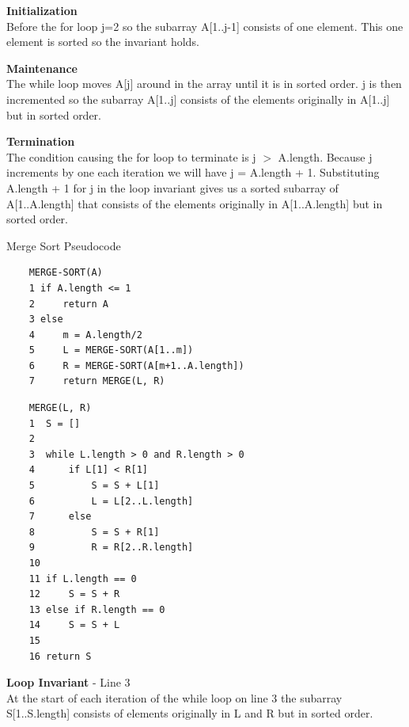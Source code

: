 \documentclass[a4paper]{article}
\newenvironment{myindentpar}[1]%
  {\begin{list}{}%
          {\setlength{\leftmargin}{#1}}%
          \item[]%
  }
  {\end{list}}
\begin{document}
    \begin{myindentpar}{0.5cm}
        \textbf{Initialization}\\
        Before the for loop j=2 so the subarray A[1..j-1] consists of one element. This
        one element is sorted so the invariant holds.

        \textbf{Maintenance}\\
        The while loop moves A[j] around in the array until it is in sorted order. j is 
        then incremented so the subarray A[1..j] consists of the elements originally 
        in A[1..j] but in sorted order.

        \textbf{Termination}\\
        The condition causing the for loop to terminate is j $>$ A.length. Because j 
        increments by one each iteration we will have j = A.length + 1. Substituting
        A.length + 1 for j in the loop invariant gives us a sorted subarray of
        A[1..A.length] that consists of the elements originally in A[1..A.length] but
        in sorted order. 

    \end{myindentpar}

    \newpage
    Merge Sort Pseudocode
    \begin{verbatim}
    MERGE-SORT(A)
    1 if A.length <= 1
    2     return A
    3 else
    4     m = A.length/2
    5     L = MERGE-SORT(A[1..m])
    6     R = MERGE-SORT(A[m+1..A.length])
    7     return MERGE(L, R)
    \end{verbatim}

    \begin{verbatim}
    MERGE(L, R)
    1  S = []
    2    
    3  while L.length > 0 and R.length > 0
    4      if L[1] < R[1]
    5          S = S + L[1]
    6          L = L[2..L.length]
    7      else
    8          S = S + R[1]
    9          R = R[2..R.length]
    10    
    11 if L.length == 0
    12     S = S + R
    13 else if R.length == 0
    14     S = S + L
    15    
    16 return S
    \end{verbatim}
    
    \textbf{Loop Invariant} - Line 3\\
    At the start of each iteration of the while loop on line 3 the subarray 
    S[1..S.length] consists of elements originally in L and R but in sorted order.
\end{document}
